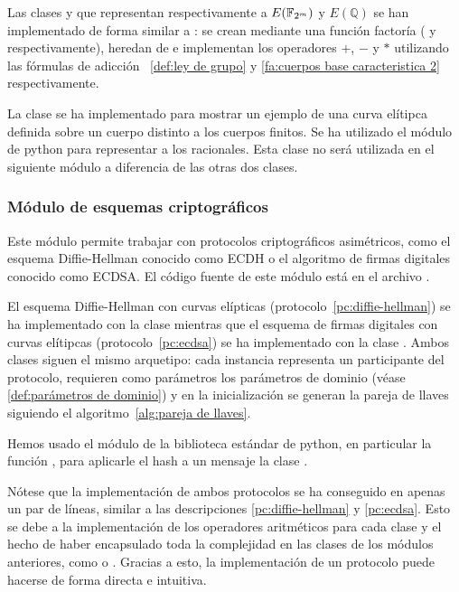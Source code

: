 Las clases  y  que representan respectivamente a $E(\mathbb{F}_{2^m})$ y $E(\mathbb{Q})$ se han implementado de forma similar a : se crean mediante una función factoría ( y  respectivamente), heredan de  e implementan los operadores $+$, $-$ y $*$ utilizando las fórmulas de adicción ~\ref{def:ley de grupo} y \ref{fa:cuerpos base caracteristica 2} respectivamente.

La clase  se ha implementado para mostrar un ejemplo de una curva elítipca definida sobre un cuerpo distinto a los cuerpos finitos. Se ha utilizado el módulo  de python para representar a los racionales. Esta clase no será utilizada en el siguiente módulo a diferencia de las otras dos clases.

\subsubsection{Módulo de esquemas criptográficos}
\label{subs:Módulo de esquemas criptográficos}

Este módulo permite trabajar con protocolos criptográficos asimétricos,
como el esquema Diffie-Hellman conocido como ECDH o el algoritmo
de firmas digitales conocido como ECDSA. El código fuente de este módulo está en el archivo .

El esquema Diffie-Hellman con curvas elípticas (protocolo~\ref{pc:diffie-hellman}) se ha implementado con la clase  mientras que el esquema de firmas digitales con curvas elítipcas (protocolo~\ref{pc:ecdsa}) se ha implementado con la clase . Ambos clases siguen el mismo arquetipo: cada instancia representa un participante del protocolo, requieren como parámetros los parámetros de dominio (véase \ref{def:parámetros de dominio}) y en la inicialización se generan la pareja de llaves siguiendo el algoritmo~\ref{alg:pareja de llaves}.

Hemos usado el módulo  de la biblioteca estándar de python, en particular la función , para aplicarle el hash a un mensaje la clase .

Nótese que la implementación de ambos protocolos se ha conseguido en apenas un par de líneas, similar a las descripciones \ref{pc:diffie-hellman} y \ref{pc:ecdsa}. Esto se debe a la implementación de los operadores aritméticos para cada clase y el hecho de haber encapsulado toda la complejidad en las clases de los módulos anteriores, como  o . Gracias a esto, la implementación de un protocolo puede hacerse de forma directa e intuitiva.

